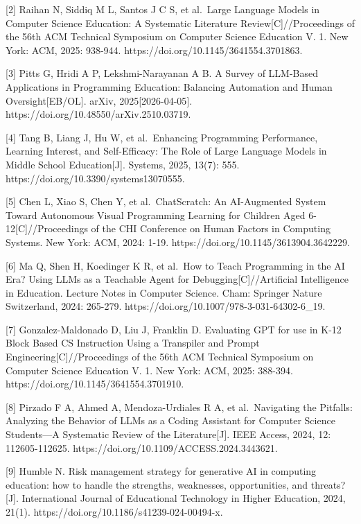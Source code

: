 {[}2{]} Raihan N, Siddiq M L, Santos J C S, et al.~Large Language Models in Computer Science Education: A Systematic Literature Review{[}C{]}//Proceedings of the 56th ACM Technical Symposium on Computer Science Education V. 1. New York: ACM, 2025: 938-944. https://doi.org/10.1145/3641554.3701863.

{[}3{]} Pitts G, Hridi A P, Lekshmi-Narayanan A B. A Survey of LLM-Based Applications in Programming Education: Balancing Automation and Human Oversight{[}EB/OL{]}. arXiv, 2025{[}2026-04-05{]}. https://doi.org/10.48550/arXiv.2510.03719.

{[}4{]} Tang B, Liang J, Hu W, et al.~Enhancing Programming Performance, Learning Interest, and Self-Efficacy: The Role of Large Language Models in Middle School Education{[}J{]}. Systems, 2025, 13(7): 555. https://doi.org/10.3390/systems13070555.

{[}5{]} Chen L, Xiao S, Chen Y, et al.~ChatScratch: An AI-Augmented System Toward Autonomous Visual Programming Learning for Children Aged 6-12{[}C{]}//Proceedings of the CHI Conference on Human Factors in Computing Systems. New York: ACM, 2024: 1-19. https://doi.org/10.1145/3613904.3642229.

{[}6{]} Ma Q, Shen H, Koedinger K R, et al.~How to Teach Programming in the AI Era? Using LLMs as a Teachable Agent for Debugging{[}C{]}//Artificial Intelligence in Education. Lecture Notes in Computer Science. Cham: Springer Nature Switzerland, 2024: 265-279. https://doi.org/10.1007/978-3-031-64302-6\_19.

{[}7{]} Gonzalez-Maldonado D, Liu J, Franklin D. Evaluating GPT for use in K-12 Block Based CS Instruction Using a Transpiler and Prompt Engineering{[}C{]}//Proceedings of the 56th ACM Technical Symposium on Computer Science Education V. 1. New York: ACM, 2025: 388-394. https://doi.org/10.1145/3641554.3701910.

{[}8{]} Pirzado F A, Ahmed A, Mendoza-Urdiales R A, et al.~Navigating the Pitfalls: Analyzing the Behavior of LLMs as a Coding Assistant for Computer Science Students---A Systematic Review of the Literature{[}J{]}. IEEE Access, 2024, 12: 112605-112625. https://doi.org/10.1109/ACCESS.2024.3443621.

{[}9{]} Humble N. Risk management strategy for generative AI in computing education: how to handle the strengths, weaknesses, opportunities, and threats?{[}J{]}. International Journal of Educational Technology in Higher Education, 2024, 21(1). https://doi.org/10.1186/s41239-024-00494-x.

